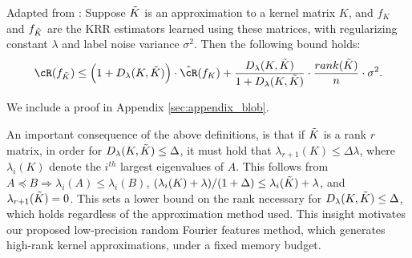 \begin{proposition}{Adapted from \citep{avron17}:}
	\label{prop:avron}
	Suppose $\tilde{K}$ is an approximation to a kernel matrix $K$, and $f_{K}$ and $f_{\tilde{K}}$ are the KRR estimators learned using these matrices, with regularizing constant $\lambda$ and label noise variance $\sigma^2$. Then the following bound holds:
	\begin{eqnarray}
	\cR(f_{\tK}) \leq \Big(1+D_{\lambda}(K,\tK)\Big)\cdot \hcR(f_K) + \frac{D_{\lambda}(K,\tK)}{1+D_{\lambda}(K,\tK)}\cdot \frac{rank(\tK)}{n}\cdot\sigma^2.
	\end{eqnarray}
\end{proposition}
We include a proof in Appendix \ref{sec:appendix_blob}.

An important consequence of the above definitions, is that if $\tilde{K}$ is a rank $r$ matrix, in order for $D_{\lambda}(K,\tilde{K}) \leq \Delta$, it must hold that $\lambda_{r+1}(K) \leq \Delta \lambda$, where $\lambda_i(K)$ denote the $i^{th}$ largest eigenvalues of $A$.  This follows from $A\preceq B \Rightarrow \lambda_i(A) \leq \lambda_i(B)$, $(\lambda_i(K) + \lambda)/(1+\Delta) \leq \lambda_i(\tilde{K}) + \lambda$, and $\lambda_{r+1}(\tilde{K}) = 0$.  This sets a lower bound on the rank necessary for $D_{\lambda}(K,\tilde{K}) \leq \Delta$, which holds regardless of the approximation method used. This insight motivates our proposed low-precision random Fourier features method, which generates high-rank kernel approximations, under a fixed memory budget.